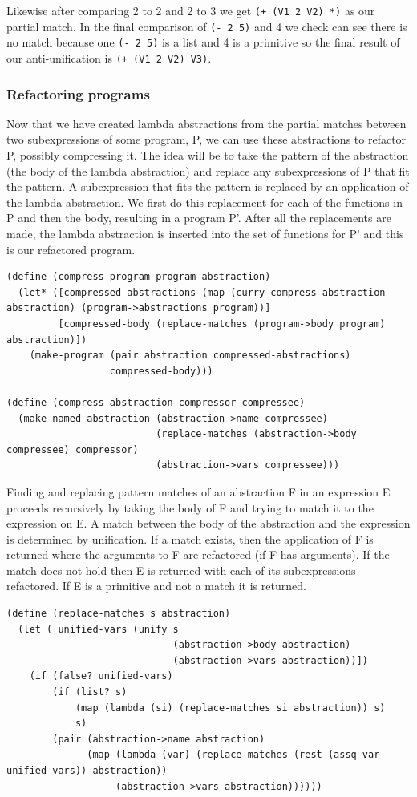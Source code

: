 \documentclass[a4paper,10pt]{article}
\begin{document}
Likewise after comparing 2 to 2 and 2 to 3 we get \texttt{(+ (V1 2 V2) *)} as our partial match.
In the final comparison of \texttt{(- 2 5)} and 4 we check can see there is no match because one \texttt{(- 2 5)} is a list and 4 is a primitive so the final result of our anti-unification is \texttt{(+ (V1 2 V2) V3)}.


\subsubsection{Refactoring programs}
Now that we have created lambda abstractions from the partial matches between two subexpressions of some program, P, we can use these abstractions to refactor P, possibly compressing it.  The idea will be to take the pattern of the abstraction (the body of the lambda abstraction) and replace any subexpressions of P that fit the pattern.  A subexpression that fits the pattern is replaced by an application of the lambda abstraction.  We first do this replacement for each of the functions in P and then the body, resulting in a program P'.  After all the replacements are made, the lambda abstraction is inserted into the set of functions for P' and this is our refactored program.
\begin{lstlisting}[frame=trBL]
(define (compress-program program abstraction)
  (let* ([compressed-abstractions (map (curry compress-abstraction abstraction) (program->abstractions program))]
         [compressed-body (replace-matches (program->body program) abstraction)])
    (make-program (pair abstraction compressed-abstractions)
                  compressed-body)))

(define (compress-abstraction compressor compressee)
  (make-named-abstraction (abstraction->name compressee)
                          (replace-matches (abstraction->body compressee) compressor)
                          (abstraction->vars compressee)))                           
\end{lstlisting}
Finding and replacing pattern matches of an abstraction F in an expression E proceeds recursively by taking the body of F and trying to match it to the expression on E.  A match between the body of the abstraction and the expression is determined by unification. If a match exists, then the application of F is returned where the arguments to F are refactored (if F has arguments).  If the match does not hold then E is returned with each of its subexpressions refactored.  If E is a primitive and not a match it is returned.

\begin{lstlisting}[frame=trBL]
(define (replace-matches s abstraction)
  (let ([unified-vars (unify s
                             (abstraction->body abstraction)
                             (abstraction->vars abstraction))])
    (if (false? unified-vars)
        (if (list? s)
            (map (lambda (si) (replace-matches si abstraction)) s)
            s)
        (pair (abstraction->name abstraction)
              (map (lambda (var) (replace-matches (rest (assq var unified-vars)) abstraction))
                   (abstraction->vars abstraction))))))
\end{lstlisting}
\end{document}
